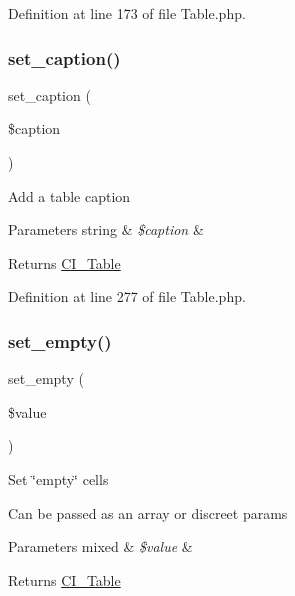 Definition at line 173 of file Table.\+php.

\mbox{\label{class_c_i___table_ab6146f0f242d4bc75169c8f8e622e979}} 
\subsubsection{\texorpdfstring{set\_caption()}{set\_caption()}}
{\footnotesize\ttfamily set\+\_\+caption (\begin{DoxyParamCaption}\item[{}]{\$caption }\end{DoxyParamCaption})}

Add a table caption


\begin{DoxyParams}[1]{Parameters}
string & {\em \$caption} & \\
\hline
\end{DoxyParams}
\begin{DoxyReturn}{Returns}
\mbox{\hyperlink{class_c_i___table}{C\+I\+\_\+\+Table}} 
\end{DoxyReturn}


Definition at line 277 of file Table.\+php.

\mbox{\label{class_c_i___table_a20b008428100a2b740c02c4bcaa45cf6}} 
\subsubsection{\texorpdfstring{set\_empty()}{set\_empty()}}
{\footnotesize\ttfamily set\+\_\+empty (\begin{DoxyParamCaption}\item[{}]{\$value }\end{DoxyParamCaption})}

Set \char`\"{}empty\char`\"{} cells

Can be passed as an array or discreet params


\begin{DoxyParams}[1]{Parameters}
mixed & {\em \$value} & \\
\hline
\end{DoxyParams}
\begin{DoxyReturn}{Returns}
\mbox{\hyperlink{class_c_i___table}{C\+I\+\_\+\+Table}} 
\end{DoxyReturn}


